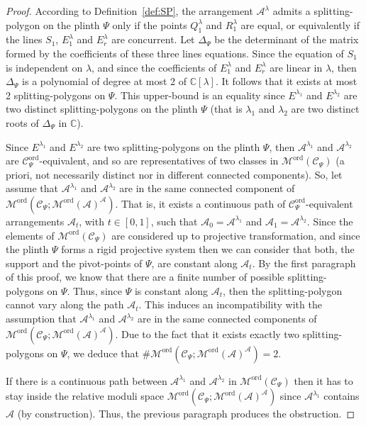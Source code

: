 \documentclass[11pt, a4paper]{amsart}
\theoremstyle{definition}
\theoremstyle{remark}
\newcommand{\CC}{\mathds{C}}
\newcommand{\A}{\mathcal{A}}
\newcommand{\C}{\mathcal{C}}
\newcommand{\M}{\mathcal{M}}
\newcommand{\ord}{\text{ord}}
\begin{document}
\begin{proof}
	According to Definition~\ref{def:SP}, the arrangement $\A^\lambda$ admits a splitting-polygon on the plinth $\Psi$ only if the points $Q^\lambda_1$ and $R^\lambda_1$ are equal, or equivalently if the lines $S_1$, $E^\lambda_1$ and $E^\lambda_r$ are concurrent. Let $\Delta_{\Psi}$ be the determinant of the matrix formed by the coefficients of these three lines equations. Since the equation of $S_1$ is independent on $\lambda$, and since the coefficients of $E^\lambda_1$ and $E^\lambda_r$ are linear in $\lambda$, then $\Delta_{\Psi}$ is a polynomial of degree at most 2 of $\CC[\lambda]$. It follows that it exists at most 2 splitting-polygons on $\Psi$. This upper-bound is an equality since $E^{\lambda_1}$ and $E^{\lambda_2}$ are two distinct splitting-polygons on the plinth $\Psi$ (that is $\lambda_1$ and $\lambda_2$ are two distinct roots of $\Delta_{\Psi}$ in $\CC$).

	Since $E^{\lambda_1}$ and $E^{\lambda_2}$ are two splitting-polygons on the plinth $\Psi$, then $\A^{\lambda_1}$ and $\A^{\lambda_2}$ are $\C_\Psi^\ord$-equivalent, and so are representatives of two classes in $\M^\ord(\C_\Psi)$ (a priori, not necessarily distinct nor in different connected components). So, let assume that $\A^{\lambda_1}$ and $\A^{\lambda_2}$ are in the same connected component of $\M^\ord(\C_\Psi;\M^\ord(\A)^\A)$. That is, it exists a continuous path of $\C_\Psi^\ord$-equivalent arrangements $\A_t$, with $t \in [0,1]$, such that $\A_0=\A^{\lambda_1}$ and  $\A_1=\A^{\lambda_2}$. Since the elements of $\M^\ord(\C_\Psi)$ are considered up to projective transformation, and since the plinth $\Psi$ forms a rigid projective system then we can consider that both, the support and the pivot-points of $\Psi$, are constant along $\A_t$. By the first paragraph of this proof, we know that there are a finite number of possible splitting-polygons on $\Psi$. Thus, since $\Psi$ is constant along $\A_t$, then the splitting-polygon cannot vary along the path $\A_t$. This induces an incompatibility with the assumption that $\A^{\lambda_1}$ and $\A^{\lambda_2}$ are in the same connected components of $\M^\ord(\C_\Psi;\M^\ord(\A)^\A)$. Due to the fact that it exists exactly two splitting-polygons on $\Psi$, we deduce that $\# \M^\ord(\C_\Psi;\M^\ord(\A)^\A) = 2$.
	
	If there is a continuous path between $\A^{\lambda_1}$ and $\A^{\lambda_2}$ in $\M^\ord(\C_\Psi)$ then it has to stay inside the relative moduli space $\M^\ord(\C_\Psi;\M^\ord(\A)^\A)$ since $\A^{\lambda_1}$ contains $\A$ (by construction). Thus, the previous paragraph produces the obstruction.
\end{proof}
\end{document}
